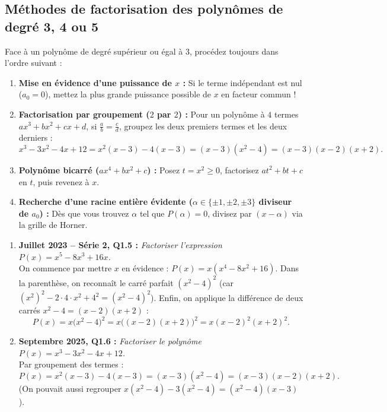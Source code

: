 \subsection{Méthodes de factorisation des polynômes de degré 3, 4 ou 5}

Face à un polynôme de degré supérieur ou égal à $3$, procédez toujours dans l'ordre suivant :

\begin{astuce}
\begin{enumerate}
    \item \textbf{Mise en évidence d'une puissance de $x$ :} Si le terme indépendant est nul ($a_0 = 0$), mettez la plus grande puissance possible de $x$ en facteur commun !
    \item \textbf{Factorisation par groupement ($2$ par $2$) :} Pour un polynôme à $4$ termes $ax^3 + bx^2 + cx + d$, si $\frac{a}{b} = \frac{c}{d}$, groupez les deux premiers termes et les deux derniers :
    \[
        x^3 - 3x^2 - 4x + 12 = x^2(x - 3) - 4(x - 3) = (x - 3)(x^2 - 4) = (x - 3)(x - 2)(x + 2).
    \]
    \item \textbf{Polynôme bicarré ($ax^4 + bx^2 + c$) :} Posez $t = x^2 \ge 0$, factorisez $at^2 + bt + c$ en $t$, puis revenez à $x$.
    \item \textbf{Recherche d'une racine entière évidente ($\alpha \in \{\pm 1, \pm 2, \pm 3\}$ diviseur de $a_0$) :} Dès que vous trouvez $\alpha$ tel que $P(\alpha) = 0$, divisez par $(x - \alpha)$ via la grille de Horner.
\end{enumerate}
\end{astuce}

\begin{exemple}
\begin{enumerate}
    \item \textbf{Juillet 2023 -- Série 2, Q1.5 :} \emph{Factoriser l'expression $P(x) = x^5 - 8x^3 + 16x$.}\\
    On commence par mettre $x$ en évidence : $P(x) = x(x^4 - 8x^2 + 16)$. Dans la parenthèse, on reconnaît le carré parfait $(x^2 - 4)^2$ (car $(x^2)^2 - 2\cdot 4\cdot x^2 + 4^2 = (x^2-4)^2$). Enfin, on applique la différence de deux carrés $x^2 - 4 = (x - 2)(x + 2)$ :
    \[
        P(x) = x\bigl(x^2 - 4\bigr)^2 = x\bigl((x - 2)(x + 2)\bigr)^2 = \boxed{x(x - 2)^2(x + 2)^2}.
    \]
    \item \textbf{Septembre 2025, Q1.6 :} \emph{Factoriser le polynôme $P(x) = x^3 - 3x^2 - 4x + 12$.}\\
    Par groupement des termes :
    \[
        P(x) = x^2(x - 3) - 4(x - 3) = (x - 3)(x^2 - 4) = \boxed{(x - 3)(x - 2)(x + 2)}.
    \]
    (On pouvait aussi regrouper $x(x^2 - 4) - 3(x^2 - 4) = (x^2 - 4)(x - 3)$).
\end{enumerate}
\end{exemple}

